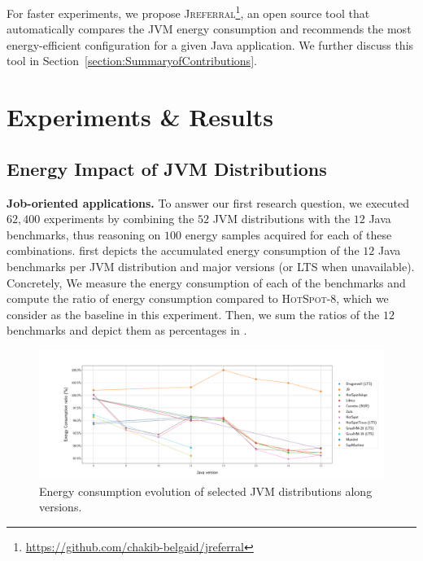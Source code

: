 For faster experiments, we propose \textsc{Jreferral}\footnote{\url{https://github.com/chakib-belgaid/jreferral}}, an open source tool that automatically compares the JVM energy consumption and recommends the most energy-efficient configuration for a given Java application.
We further discuss this tool in Section~\ref{section:SummaryofContributions}.


\section{Experiments \& Results}\label{sec:exp}
\subsection{Energy Impact of JVM Distributions}
\noindent\textbf{Job-oriented applications.}
To answer our first research question, we executed $62,400$ experiments by combining the $52$ JVM distributions with the $12$ Java benchmarks, thus reasoning on $100$ energy samples acquired for each of these combinations.
 first depicts the accumulated energy consumption of the $12$ Java benchmarks per JVM distribution and major versions (or LTS when unavailable).
Concretely, We measure the energy consumption of each of the benchmarks and compute the ratio of energy consumption compared to \textsc{HotSpot-8}, which we consider as the baseline in this experiment.
Then, we sum the ratios of the $12$ benchmarks and depict them as percentages in .

\begin{figure}%
    \centering
    \includegraphics[width=\linewidth]{imgs/alljvms_chetemi8_baseon8.pdf}
    \caption{Energy consumption evolution of selected JVM distributions along versions.}
    \label{fig:JVMs}
\end{figure}

